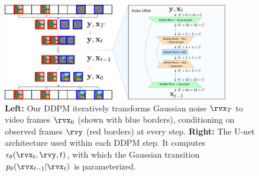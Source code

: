 \begin{figure}[t]
    \centering
    \includegraphics[width=0.88\textwidth]{figs/fdm/video-architecture-v8.pdf}
    \caption{\textbf{Left:} Our DDPM iteratively transforms Gaussian noise $\rvx_T$ to video frames $\rvx_0$ (shown with blue borders), conditioning on observed frames $\rvy$ (red borders) at every step. \textbf{Right:} The U-net architecture used within each DDPM step. It computes $\epsilon_\theta(\rvx_t, \rvy, t)$, with which the Gaussian transition $p_\theta(\rvx_{t-1}|\rvx_t)$ is parameterized.
    }
    \label{fig:architecture}
\end{figure}

